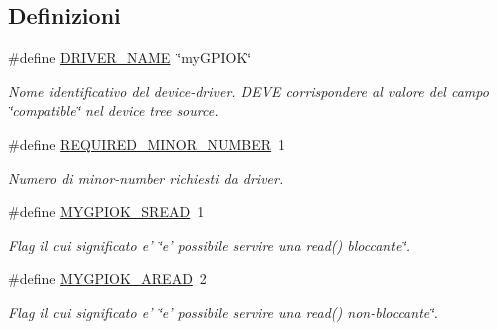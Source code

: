 \subsection*{Definizioni}
\begin{DoxyCompactItemize}
\item 
\#define \hyperlink{group___kernel-_module_ga25634d21648ca7fb7a2aca614bafaaeb}{D\+R\+I\+V\+E\+R\+\_\+\+N\+A\+M\+E}~\char`\"{}my\+G\+P\+I\+O\+K\char`\"{}
\begin{DoxyCompactList}\small\item\em Nome identificativo del device-\/driver. D\+E\+V\+E corrispondere al valore del campo \char`\"{}compatible\char`\"{} nel device tree source. \end{DoxyCompactList}\item 
\#define \hyperlink{group___kernel-_module_ga605a877d5e63c79a65d4a57d364680b4}{R\+E\+Q\+U\+I\+R\+E\+D\+\_\+\+M\+I\+N\+O\+R\+\_\+\+N\+U\+M\+B\+E\+R}~1
\begin{DoxyCompactList}\small\item\em Numero di minor-\/number richiesti da driver. \end{DoxyCompactList}\item 
\#define \hyperlink{group___kernel-_module_ga71d797b61faad7d2c7071da10880a71d}{M\+Y\+G\+P\+I\+O\+K\+\_\+\+S\+R\+E\+A\+D}~1
\begin{DoxyCompactList}\small\item\em Flag il cui significato e' \char`\"{}e' possibile servire una read() bloccante\char`\"{}. \end{DoxyCompactList}\item 
\#define \hyperlink{group___kernel-_module_ga2ae183c0bf8cbddbd7337f6b8a3d598b}{M\+Y\+G\+P\+I\+O\+K\+\_\+\+A\+R\+E\+A\+D}~2
\begin{DoxyCompactList}\small\item\em Flag il cui significato e' \char`\"{}e' possibile servire una read() non-\/bloccante\char`\"{}. \end{DoxyCompactList}\end{DoxyCompactItemize}
